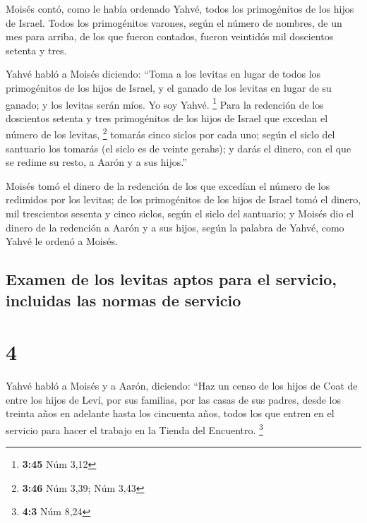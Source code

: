  Moisés contó, como le había ordenado Yahvé, todos los
primogénitos de los hijos de Israel.  Todos los
primogénitos varones, según el número de nombres, de un mes para arriba,
de los que fueron contados, fueron veintidós mil doscientos setenta y
tres.

 Yahvé habló a Moisés diciendo:  ``Toma a
los levitas en lugar de todos los primogénitos de los hijos de Israel, y
el ganado de los levitas en lugar de su ganado; y los levitas serán
míos. Yo soy Yahvé. \footnote{\textbf{3:45} Núm 3,12} 
Para la redención de los doscientos setenta y tres primogénitos de los
hijos de Israel que excedan el número de los levitas, \footnote{\textbf{3:46}
  Núm 3,39; Núm 3,43}  tomarás cinco siclos por cada uno;
según el siclo del santuario los tomarás (el siclo es de veinte gerahs);
 y darás el dinero, con el que se redime su resto, a
Aarón y a sus hijos.''

 Moisés tomó el dinero de la redención de los que
excedían el número de los redimidos por los levitas;  de
los primogénitos de los hijos de Israel tomó el dinero, mil trescientos
sesenta y cinco siclos, según el siclo del santuario;  y
Moisés dio el dinero de la redención a Aarón y a sus hijos, según la
palabra de Yahvé, como Yahvé le ordenó a Moisés.

\hypertarget{examen-de-los-levitas-aptos-para-el-servicio-incluidas-las-normas-de-servicio}{%
\subsection{Examen de los levitas aptos para el servicio, incluidas las
normas de
servicio}\label{examen-de-los-levitas-aptos-para-el-servicio-incluidas-las-normas-de-servicio}}

\hypertarget{section-3}{%
\section{4}\label{section-3}}

 Yahvé habló a Moisés y a Aarón, diciendo: 
``Haz un censo de los hijos de Coat de entre los hijos de Leví, por sus
familias, por las casas de sus padres,  desde los treinta
años en adelante hasta los cincuenta años, todos los que entren en el
servicio para hacer el trabajo en la Tienda del Encuentro. \footnote{\textbf{4:3}
  Núm 8,24}

